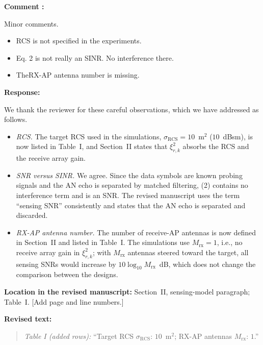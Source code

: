 \documentclass[a4paper,12pt]{article}
\newcounter{reviewcomment}
\newenvironment{reviewcomment}{%
  \stepcounter{reviewcomment}%
  \begin{shaded}
  \textbf{Comment \thereviewcomment:}\par
}{\end{shaded}}
\newenvironment{response}{\par\textbf{Response:}\par}{\par}
\newcommand{\revisionlocation}[1]{\par\textbf{Location in the revised manuscript:} #1\par}
\newenvironment{revisedtext}{%
  \par\textbf{Revised text:}\begin{quote}\color{red}
}{\end{quote}}
\begin{document}
\begin{reviewcomment}
Minor comments.
\begin{itemize}
  \item RCS is not specified in the experiments.
  \item Eq. 2 is not really an SINR. No interference there.
  \item TheRX-AP antenna number is missing.
\end{itemize}
\end{reviewcomment}
\begin{response}
We thank the reviewer for these careful observations, which we have addressed
as follows.
\begin{itemize}
  \item \emph{RCS.} The target RCS used in the simulations,
  $\sigma_{\mathrm{RCS}}=10$~m$^2$ ($10$~dBsm), is now listed in Table~I,
  and Section~II states that $\xi_{r,k}^2$ absorbs the RCS and the receive
  array gain.
  \item \emph{SNR versus SINR.} We agree. Since the data symbols are known
  probing signals and the AN echo is separated by matched filtering, (2)
  contains no interference term and is an SNR. The revised manuscript uses
  the term ``sensing SNR'' consistently and states that the AN echo is
  separated and discarded.
  \item \emph{RX-AP antenna number.} The number of receive-AP antennas is
  now defined in Section~II and listed in Table~I. The simulations use
  $M_{\mathrm{rx}}=1$, i.e., no receive array gain in $\xi_{r,k}^2$; with
  $M_{\mathrm{rx}}$ antennas steered toward the target, all sensing SNRs
  would increase by $10\log_{10}M_{\mathrm{rx}}$~dB, which does not change
  the comparison between the designs.
\end{itemize}
\end{response}
\revisionlocation{Section~II, sensing-model paragraph; Table~I. [Add page
and line numbers.]}
\begin{revisedtext}
\textit{Table I (added rows):} ``Target RCS $\sigma_{\mathrm{RCS}}$:
$10$~m$^2$; RX-AP antennas $M_{\mathrm{rx}}$: $1$.''
\end{revisedtext}

\end{document}
